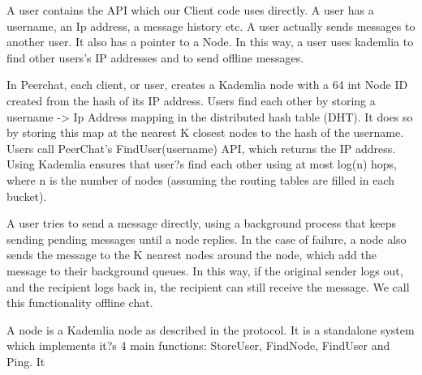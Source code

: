 \documentclass{article}
\begin{document}
A user contains the API which our Client code uses directly. A user has a username, an Ip address, a message history etc. A user actually sends messages to another user. It also has a pointer to a Node. In this way, a user uses kademlia to find other users's IP addresses and to send offline messages.

In Peerchat, each client, or user, creates a Kademlia node with a 64 int Node ID created from the hash of its IP address. Users find each other by storing a username -> Ip Address mapping in the distributed hash table (DHT). It does so by storing this map at the nearest K closest nodes to the hash of the username. Users call PeerChat's FindUser(username) API, which returns the IP address. Using Kademlia ensures that user?s find each other using at most log(n) hops, where n is the number of nodes (assuming the routing tables are filled in each bucket). 

A user tries to send a message directly, using a background process that keeps sending pending messages until a node replies. In the case of failure, a node also sends the message to the K nearest nodes around the node, which add the message to their background queues. In this way, if the original sender logs out, and the recipient logs back in, the recipient can still receive the message. We call this functionality offline chat.

A node is a Kademlia node as described in the protocol. It is a standalone system which implements it?s 4 main functions: StoreUser, FindNode, FindUser and Ping. It 
\end{document}
